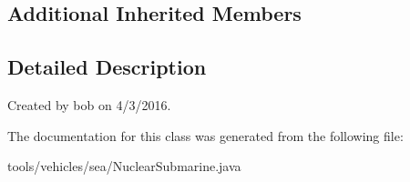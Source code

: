 \subsection*{Additional Inherited Members}


\subsection{Detailed Description}
Created by bob on 4/3/2016. 

The documentation for this class was generated from the following file\+:\begin{DoxyCompactItemize}
\item 
tools/vehicles/sea/Nuclear\+Submarine.\+java\end{DoxyCompactItemize}
